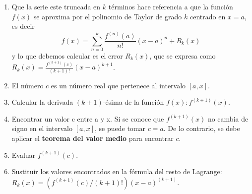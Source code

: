\documentclass[20pt,margin=1in,innermargin=-4.5in,blockverticalspace=-0.25in]{tikzposter}
\begin{document}
\begin{columns}
{        \begin{enumerate}
            \item Que la serie este truncada en $k$ términos hace referencia a que la función $f(x)$ se aproxima por el polinomio de Taylor de grado $k$ centrado en $x = a$, es decir
            \begin{equation*}
                f(x) = \sum_{n=0}^{k} \frac{f^(n)(a)}{n!}(x - a)^n + R_k(x)
            \end{equation*}
            y lo que debemos calcular es el error $R_k(x)$, que se expresa como $R_k(x) = \frac{f^{(k+1)}(c)}{(k+1)!}(x - a)^{k+1}$.
            \item El número $c$ es un número real que pertenece al intervalo $[a, x]$.
            \item Calcular la derivada $(k+1)$-ésima de la función $f(x): f^{(k+1)}(x)$.
            \item Encontrar un valor c entre a y x. Si se conoce que $f^{(k+1)}(x)$ no cambia de signo en el intervalo $[a, x]$, se puede tomar $c = a$. De lo contrario, se debe aplicar el \textbf{teorema del valor medio} para encontrar $c$.
            \item Evaluar $f^{(k+1)}(c)$.
            \item Sustituir los valores encontrados en la fórmula del resto de Lagrange: $R_k(x) = (f^{(k+1)}(c)/(k+1)!)(x - a)^{(k+1)}$.
        \end{enumerate}
    }


\end{columns}
\end{document}
